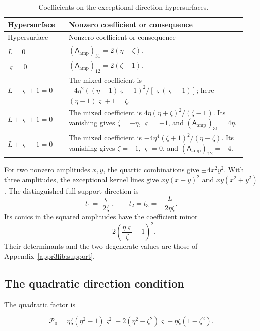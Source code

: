 \begin{longtable}{@{}>{\raggedright\arraybackslash}p{0.24\linewidth}>{\raggedright\arraybackslash}p{0.7\linewidth}@{}}
\caption{Coefficients on the exceptional direction hypersurfaces.}\label{supp:tab:r3-direction-coefficients}\\
\toprule Hypersurface & Nonzero coefficient or consequence\\\midrule\endfirsthead
\toprule Hypersurface & Nonzero coefficient or consequence\\\midrule\endhead
$L=0$ & $(\mathsf A_{\mathrm{amp}})_{31}=2(\eta-\zeta)$.\\
$\varsigma=0$ & $(\mathsf A_{\mathrm{amp}})_{12}=2(\zeta-1)$.\\
$L-\varsigma+1=0$ & The mixed coefficient is
$-4\eta^2((\eta-1)\varsigma+1)^2/[\varsigma(\varsigma-1)]$;
here $(\eta-1)\varsigma+1=\zeta$.\\
$L+\varsigma+1=0$ & The mixed coefficient is
$4\eta(\eta+\zeta)^2/(\zeta-1)$.
Its vanishing gives $\zeta=-\eta$, $\varsigma=-1$, and
$(\mathsf A_{\mathrm{amp}})_{31}=4\eta$.\\
$L+\varsigma-1=0$ & The mixed coefficient is
$-4\eta^4(\zeta+1)^2/(\eta-\zeta)$.
Its vanishing gives $\zeta=-1$, $\varsigma=0$, and
$(\mathsf A_{\mathrm{amp}})_{12}=-4$.\\
\bottomrule\end{longtable}

For two nonzero amplitudes $x,y$, the quartic combinations give
$\pm4x^2y^2$. With three amplitudes, the exceptional kernel lines
give $xy(x+y)^2$ and $xy(x^2+y^2)$.
The distinguished full-support direction is
\[
 t_1=\frac{\varsigma}{2\zeta},\qquad
 t_2=t_3=-\frac{L}{2\eta\zeta}.
\]
Its conics in the squared amplitudes have the coefficient minor
\[
 -2\left(\frac{\eta\varsigma}{\zeta}-1\right)^2.
\]
Their determinants and the two degenerate values are those of
Appendix~\ref{appr3fib:support}.

\subsection{The quadratic direction condition}

The quadratic factor is

\begin{equation}\label{supp:r3:quadratic-factor}
 \mathcal P_0=
 \eta\zeta(\eta^2-1)\varsigma^2
 -2(\eta^2-\zeta^2)\varsigma+\eta\zeta(1-\zeta^2).
\end{equation}

